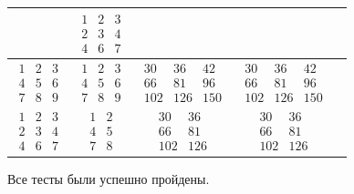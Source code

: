 \begin{table}[ht]
\begin{center}
\begin{threeparttable}
\begin{tabular}{|c|c|c|c|c|}
				&
				$\begin{matrix}
					1 & 2 & 3\\
					2 & 3 & 4\\
					4 & 6 & 7
				\end{matrix}$  \\ 
				\hline
				$\begin{matrix}
					1 & 2 & 3\\
					4 & 5 & 6\\
					7 & 8 & 9
				\end{matrix}$ 
				&  
				$\begin{matrix}
					1 & 2 & 3\\
					4 & 5 & 6\\
					7 & 8 & 9
				\end{matrix}$ 
				&
				$\begin{matrix}
					30 & 36 & 42\\
					66 & 81 & 96\\
					102 & 126 & 150
				\end{matrix}$ 
				&
				$\begin{matrix}
					30 & 36 & 42\\
					66 & 81 & 96\\
					102 & 126 & 150
				\end{matrix}$ \\ 
				\hline
				$\begin{matrix}
					1 & 2 & 3\\
					2 & 3 & 4\\
					4 & 6 & 7
				\end{matrix}$ 
				&  
				$\begin{matrix}
					1 & 2 \\
					4 & 5 \\
					7 & 8 
				\end{matrix}$
				&
				$\begin{matrix}
					30 & 36 \\
					66 & 81 \\
					102 & 126
				\end{matrix}$
				&
				$\begin{matrix}
					30 & 36 \\
					66 & 81 \\
					102 & 126
				\end{matrix}$ \\ 
				\hline
			\end{tabular}
		\end{threeparttable}
	\end{center}
\end{table}

Все тесты были успешно пройдены.
